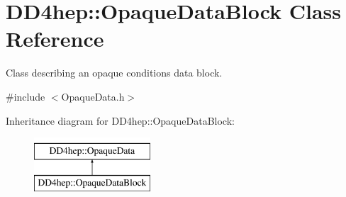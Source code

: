 \hypertarget{class_d_d4hep_1_1_opaque_data_block}{}\section{D\+D4hep\+:\+:Opaque\+Data\+Block Class Reference}
\label{class_d_d4hep_1_1_opaque_data_block}


Class describing an opaque conditions data block.  




{\ttfamily \#include $<$Opaque\+Data.\+h$>$}

Inheritance diagram for D\+D4hep\+:\+:Opaque\+Data\+Block\+:\begin{figure}[H]
\begin{center}
\leavevmode
\includegraphics[height=2.000000cm]{class_d_d4hep_1_1_opaque_data_block}
\end{center}
\end{figure}
